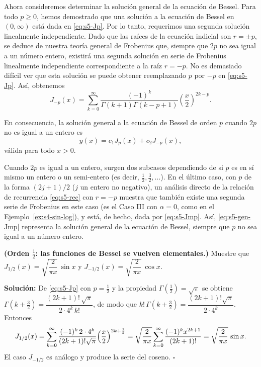 Ahora consideremos determinar la solución general de la ecuación de Bessel. Para todo $p \ge 0$, hemos demostrado que una solución a la ecuación de Bessel en $(0, \infty)$ está dada en \eqref{eq:s5-Jp}. Por lo tanto, requerimos una segunda solución linealmente independiente. Dado que las raíces de la ecuación indicial son $r = \pm p$, se deduce de nuestra teoría general de Frobenius que, siempre que $2p$ no sea igual a un número entero, existirá una segunda solución en serie de Frobenius linealmente independiente correspondiente a la raíz $r = -p$. No es demasiado difícil ver que esta solución se puede obtener reemplazando $p$ por $-p$ en \eqref{eq:s5-Jp}. Así, obtenemos
\begin{equation}
J_{-p}(x) = \sum_{k=0}^{\infty} \frac{(-1)^k}{\Gamma(k + 1)\Gamma(k - p + 1)} \left(\frac{x}{2}\right)^{2k-p}.
\label{eq:s5-Jmp}
\end{equation}
 
\begin{remark}
En consecuencia, la solución general a la ecuación de Bessel de orden $p$ cuando $2p$ no es igual a un entero es
\begin{equation}
y(x) = c_1 J_p(x) + c_2 J_{-p}(x),
\label{eq:s5-gen-Jmp}
\end{equation}
válida para todo $x>0$.
\end{remark}
 
Cuando $2p$ es igual a un entero, surgen dos subcasos dependiendo de si $p$ es en sí mismo un entero o un semi-entero (es decir, $\frac{1}{2}, \frac{3}{2}, \dots$). En el último caso, con $p$ de la forma $(2j + 1)/2$ ($j$ un entero no negativo), un análisis directo de la relación de recurrencia \eqref{eq:s5-rec} con $r = -p$ muestra que también existe una segunda serie de Frobenius en este caso (es el Caso III con $\alpha=0$, como en el Ejemplo~\ref{ex:s4-sin-log}), y está, de hecho, dada por \eqref{eq:s5-Jmp}. Así, \eqref{eq:s5-gen-Jmp} representa la solución general de la ecuación de Bessel, siempre que $p$ no sea igual a un número entero.
 
\begin{example}\label{ex:s5-medio}
\textbf{(Orden $\frac12$: las funciones de Bessel se vuelven elementales.)} Muestre que $J_{1/2}(x)=\sqrt{\dfrac{2}{\pi x}}\,\sin x$ y $J_{-1/2}(x)=\sqrt{\dfrac{2}{\pi x}}\,\cos x$.
 
\noindent \textbf{Solución:} \quad De \eqref{eq:s5-Jp} con $p=\frac12$ y la propiedad $\Gamma(\tfrac12)=\sqrt\pi$ se obtiene $\Gamma(k+\tfrac32)=\dfrac{(2k+1)!\,\sqrt\pi}{2\cdot4^k\,k!}$, de modo que $k!\,\Gamma(k+\tfrac32)=\dfrac{(2k+1)!\sqrt\pi}{2\cdot4^k}$. Entonces
\[ J_{1/2}(x)=\sum_{k=0}^{\infty}\frac{(-1)^k\,2\cdot4^k}{(2k+1)!\sqrt\pi}\Bigl(\frac x2\Bigr)^{2k+\frac12}
=\sqrt{\frac{2}{\pi x}}\sum_{k=0}^{\infty}\frac{(-1)^k x^{2k+1}}{(2k+1)!}=\sqrt{\frac{2}{\pi x}}\,\sin x. \]
El caso $J_{-1/2}$ es análogo y produce la serie del coseno. \hfill $\square$
\end{example}
 
